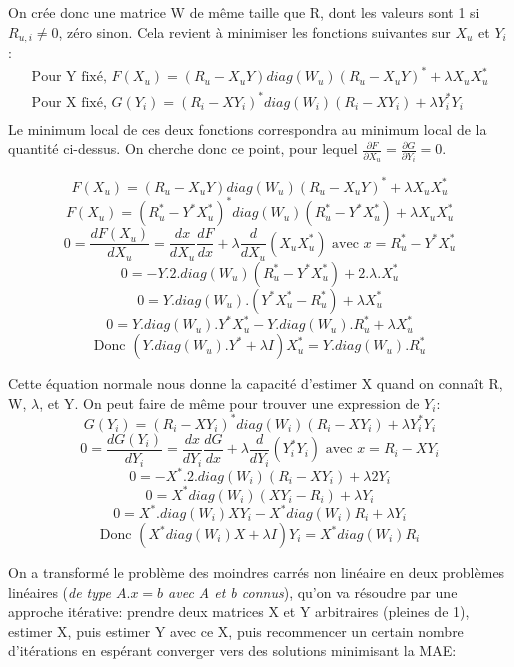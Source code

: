 \documentclass[12pt,a4paper]{article}
\begin{document}
On crée donc une matrice W de même taille que R, dont les valeurs sont 1 si $R_{u,i} \neq 0$, zéro sinon. Cela revient à minimiser les fonctions suivantes sur $X_u$ et $Y_i$ :
$$\begin{array}{l}
\text{Pour Y fixé, } F(X_u) = (R_u -X_uY) diag(W_u) (R_u -X_uY)^* + \lambda X_u X_u^*\\
\text{Pour X fixé, } G(Y_i) = (R_i -XY_i)^* diag(W_i) (R_i -XY_i) + \lambda Y_i^*Y_i\\
\end{array}$$
Le minimum local de ces deux fonctions correspondra au minimum local de la quantité ci-dessus. On cherche donc ce point, pour lequel $\frac{\partial F}{\partial X_u}=\frac{\partial G}{\partial Y_i}=0$.

$$F(X_u) = (R_u -X_uY) diag(W_u) (R_u -X_uY)^* + \lambda X_u X_u^*$$
$$F(X_u) = (R_u^* -Y^*X_u^*)^* diag(W_u) (R_u^* -Y^*X_u^*) + \lambda X_u X_u^*$$
$$0=\frac{dF(X_u)}{dX_u}=\frac{dx}{dX_u}\frac{dF}{dx}+\lambda \frac{d}{dX_u}(X_uX_u^*) \text{ avec } x=R_u^* -Y^*X_u^*$$
$$0=-Y.2.diag(W_u)(R_u^*-Y^*X_u^*)+2.\lambda.X_u^*$$
$$0=Y.diag(W_u).(Y^*X_u^*-R_u^*)+\lambda X_u^*$$
$$0=Y.diag(W_u).Y^*X_u^*-Y.diag(W_u).R_u^*+\lambda X_u^*$$
$$\text{Donc }(Y.diag(W_u).Y^*+\lambda I)X_u^* = Y.diag(W_u).R_u^*$$
\begin{center}
\end{center}
Cette équation normale nous donne la capacité d'estimer X quand on connaît R, W, $\lambda$, et Y. On peut faire de même pour trouver une expression de $Y_i$:
$$G(Y_i) = (R_i -XY_i)^* diag(W_i) (R_i -XY_i) + \lambda Y_i^*Y_i$$
$$0=\frac{dG(Y_i)}{dY_i}=\frac{dx}{dY_i}\frac{dG}{dx}+\lambda \frac{d}{dY_i}(Y_i^*Y_i)\text{ avec }x=R_i-XY_i$$
$$0=-X^*.2.diag(W_i)(R_i -XY_i) + \lambda 2 Y_i$$
$$0=X^*diag(W_i)(XY_i-R_i)+\lambda Y_i$$
$$0=X^*.diag(W_i)XY_i-X^*diag(W_i)R_i+\lambda Y_i$$
$$\text{Donc }(X^*diag(W_i)X+\lambda I)Y_i=X^*diag(W_i)R_i$$
\begin{center}
\end{center}
On a transformé le problème des moindres carrés non linéaire en deux problèmes linéaires (\textit{de type $A.x=b$ avec A et b connus}), qu'on va résoudre par une approche itérative: prendre deux matrices X et Y arbitraires (pleines de 1), estimer X, puis estimer Y avec ce X, puis recommencer un certain nombre d'itérations en espérant converger vers des solutions minimisant la MAE:
\newpage
\end{document}
